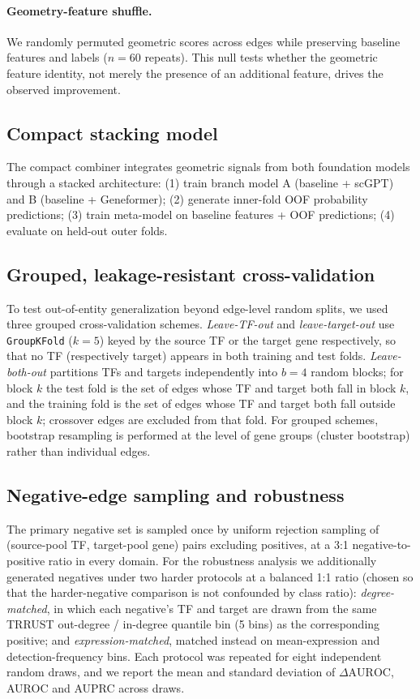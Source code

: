 \documentclass[11pt]{article}
\newcommand{\DAURC}{\Delta\mathrm{AUROC}}
\begin{document}
\paragraph{Geometry-feature shuffle.}
We randomly permuted geometric scores across edges while preserving baseline features and labels ($n = 60$ repeats).
This null tests whether the geometric feature identity, not merely the presence of an additional feature, drives the observed improvement.

\subsection*{Compact stacking model}

The compact combiner integrates geometric signals from both foundation models through a stacked architecture: (1) train branch model A (baseline + scGPT) and B (baseline + Geneformer); (2) generate inner-fold OOF probability predictions; (3) train meta-model on baseline features + OOF predictions; (4) evaluate on held-out outer folds.

\subsection*{Grouped, leakage-resistant cross-validation}

To test out-of-entity generalization beyond edge-level random splits, we used three grouped cross-validation schemes.
\emph{Leave-TF-out} and \emph{leave-target-out} use \texttt{GroupKFold} ($k=5$) keyed by the source TF or the target gene respectively, so that no TF (respectively target) appears in both training and test folds.
\emph{Leave-both-out} partitions TFs and targets independently into $b=4$ random blocks; for block $k$ the test fold is the set of edges whose TF and target both fall in block $k$, and the training fold is the set of edges whose TF and target both fall outside block $k$; crossover edges are excluded from that fold.
For grouped schemes, bootstrap resampling is performed at the level of gene groups (cluster bootstrap) rather than individual edges.

\subsection*{Negative-edge sampling and robustness}

The primary negative set is sampled once by uniform rejection sampling of (source-pool TF, target-pool gene) pairs excluding positives, at a 3:1 negative-to-positive ratio in every domain.
For the robustness analysis we additionally generated negatives under two harder protocols at a balanced 1:1 ratio (chosen so that the harder-negative comparison is not confounded by class ratio): \emph{degree-matched}, in which each negative's TF and target are drawn from the same TRRUST out-degree / in-degree quantile bin (5 bins) as the corresponding positive; and \emph{expression-matched}, matched instead on mean-expression and detection-frequency bins.
Each protocol was repeated for eight independent random draws, and we report the mean and standard deviation of $\DAURC$, AUROC and AUPRC across draws.
\end{document}
